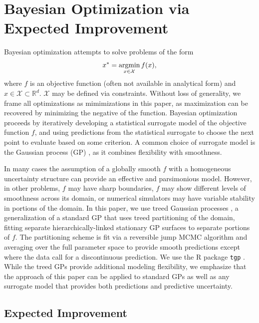 \documentclass{article}
\newcommand{\argmin}{\operatornamewithlimits{argmin}}
\begin{document}
%
%
\section{Bayesian Optimization via Expected Improvement}
\label{sec:gp}
%
%

Bayesian optimization attempts to solve problems of the form
\[
x^* = \argmin_{x\in\mathcal{X}} f(x),
\]
where $f$ is an objective function (often not available in analytical
form) and $x\in\mathcal{X}\subset\mathbb{R}^d$. $\mathcal{X}$ may be
defined via constraints. Without loss of generality, we frame all
optimizations as mimimizations in this paper, as maximization can be
recovered by minimizing the negative of the function. Bayesian
optimization proceeds by iteratively
developing a statistical surrogate model of the objective
function $f$, and using predictions from the statistical surrogate to
choose the next point to evaluate based on some criterion. A
common choice of surrogate model is the Gaussian process (GP)
\cite{gramacy:2020,TonyBook}, as it combines flexibility with smoothness.

In many cases the assumption of a globally smooth $f$ with a homogeneous 
uncertainty structure can provide an effective and parsimonious
model. However, in other problems, $f$ may have 
sharp boundaries, $f$ may show different levels of smoothness across
its domain, or numerical simulators may have variable stability in 
portions of the domain. In this paper, we use treed Gaussian
processes \cite{gpJasa}, a generalization of a standard GP that uses
treed partitioning of the domain, fitting separate hierarchically-linked stationary GP 
surfaces to separate portions of $f$. 
The partitioning scheme is fit via a reversible jump MCMC 
algorithm and 
averaging over the full parameter space to provide smooth predictions except 
where the data call for a discontinuous prediction. We use the R package 
\verb|tgp| \citep{tgp, tgp2}. While the treed GPs provide additional
modeling flexibility, we emphasize that the approach of this paper can
be applied to standard GPs as well as any surrogate model that
provides both predictions and predictive uncertainty.



%
%
\subsection{Expected Improvement}
%
%
\end{document}
